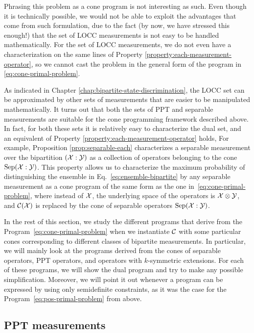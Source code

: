 Phrasing this problem as a cone program is not interesting as such. Even though it is
technically possible, we would not be able to exploit the advantages that come from such formulation, 
due to the fact (by now, we have stressed this enough!) that the set of LOCC measurements 
is not easy to be handled mathematically.
For the set of LOCC measurements, we do not even have a characterization
on the same lines of Property \ref{property:each-measurement-operator}, so we cannot cast
the problem in the general form of the program in \eqref{eq:cone-primal-problem}. 

As indicated in Chapter \ref{chap:bipartite-state-discrimination}, the LOCC set
can be approximated by other sets of measurements that are easier to be manipulated 
mathematically. It turns out that both the sets of PPT and separable measurements are
suitable for the cone programming framework described above. In fact, for both 
these sets it is relatively easy to characterize the dual set, and an equivalent 
of Property \ref{property:each-measurement-operator} holds,
For example, Proposition \ref{prop:separable-each} characterizes a separable 
measurement over the bipartition $(\mathcal{X}:\mathcal{Y})$ as a collection of operators 
belonging to the cone $\mathrm{Sep}(\mathcal{X}:\mathcal{Y})$.
This property allows us to characterize the maximum probability of 
distinguishing the ensemble in Eq.~\eqref{eq:ensemble-bipartite} by any 
separable measurement as a cone program of the same form as the one 
in~\eqref{eq:cone-primal-problem}, where instead of $\mathcal{X}$, the underlying space 
of the operators is $\mathcal{X}\otimes\mathcal{Y}$, and $\mathcal{C}(\mathcal{X})$ is replaced by the cone of 
separable operators $\mathrm{Sep}(\mathcal{X}:\mathcal{Y})$.

In the rest of this section, we study the different programs that derive 
from the Program~\eqref{eq:cone-primal-problem} when we instantiate $\mathcal{C}$ with
some particular cones corresponding to different classes of bipartite 
measurements. In particular, we will mainly look at the programs derived from the cones
of separable operators, PPT operators, and operators with $k$-symmetric extensions.
For each of these programs, we will show the dual program and try to make any possible
simplification. Moreover, we will point it out whenever a program can be 
expressed by using only semidefinite constraints, as it was the case for the 
Program~\eqref{eq:pos-primal-problem} from above.

\subsection{PPT measurements}

